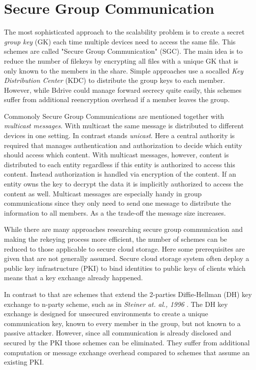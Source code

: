 \section{Secure Group Communication}
The most sophisticated approach to the scalability problem is to create a secret \textit{group key} (\ac{GK}) each time multiple devices need to access the same file. This schemes are called "Secure Group Communication" (\ac{SGC}). The main idea is to reduce the number of filekeys by encrypting all files with a unique \ac{GK} that is only known to the members in the share. Simple approaches use a socalled \textit{Key Distribution Center} (\ac{KDC}) to distribute the group keys to each member. However, while Bdrive could manage forward secrecy quite easily, this schemes suffer from additional reencryption overhead if a member leaves the group. 

Commonoly Secure Group Communications are mentioned together with \textit{multicast messages}. With multicast the same message is distributed to different devices in one setting. In contrast stands \textit{unicast}. Here a central authority is required that manages authentication and authorization to decide which entity should access which content. With multicast messages, however, content is distributed to each entity regardless if this entity is authorized to access this content. Instead authorization is handled via encryption of the content. If an entity owns the key to decrypt the data it is implicitly authorized to access the content as well. Multicast messages are especially handy in group communications since they only need to send one message to distribute the information to all members. As a the trade-off the message size increases.

While there are many approaches researching secure group communication and making the rekeying process more efficient, the number of schemes can be reduced to those applicable to secure cloud storage. Here some prerequisites are given that are not generally assumed. Secure cloud storage system often deploy a public key infrastructure (\ac{PKI}) to bind identities to public keys of clients which means that a key exchange already happened.

In contrast to that are schemes that extend the 2-parties Diffie-Hellman (\ac{DH}) key exchange to n-party scheme, such as in \textit{Steiner at. al., 1996} \cite{steiner1996diffie}. The \ac{DH} key exchange is designed for unsecured environments to create a unique communication key, known to every member in the group, but not known to a passive attacker. However, since all communication is already disclosed and secured by the \ac{PKI} those schemes can be eliminated. They suffer from additional computation or message exchange overhead compared to schemes that assume an existing \ac{PKI}.   

